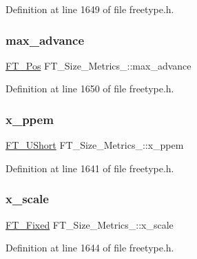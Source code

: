 Definition at line 1649 of file freetype.\+h.

\mbox{\label{struct_f_t___size___metrics___ac315a7a834ac1a57c7169ce021718958}} 
\subsubsection{\texorpdfstring{max\_advance}{max\_advance}}
{\footnotesize\ttfamily \mbox{\hyperlink{ftimage_8h_af5f230f4b253d4c7715fd2e595614c90}{F\+T\+\_\+\+Pos}} F\+T\+\_\+\+Size\+\_\+\+Metrics\+\_\+\+::max\+\_\+advance}



Definition at line 1650 of file freetype.\+h.

\mbox{\label{struct_f_t___size___metrics___abb42b175a3450e9d8b84483f166d6c8a}} 
\subsubsection{\texorpdfstring{x\_ppem}{x\_ppem}}
{\footnotesize\ttfamily \mbox{\hyperlink{fttypes_8h_a937f6c17cf5ffd09086d8610c37b9f58}{F\+T\+\_\+\+U\+Short}} F\+T\+\_\+\+Size\+\_\+\+Metrics\+\_\+\+::x\+\_\+ppem}



Definition at line 1641 of file freetype.\+h.

\mbox{\label{struct_f_t___size___metrics___a5e92028bb9881e107a6fb75d557eaff1}} 
\subsubsection{\texorpdfstring{x\_scale}{x\_scale}}
{\footnotesize\ttfamily \mbox{\hyperlink{fttypes_8h_a5f5a679cc09f758efdd0d1c5feed3c3d}{F\+T\+\_\+\+Fixed}} F\+T\+\_\+\+Size\+\_\+\+Metrics\+\_\+\+::x\+\_\+scale}



Definition at line 1644 of file freetype.\+h.

